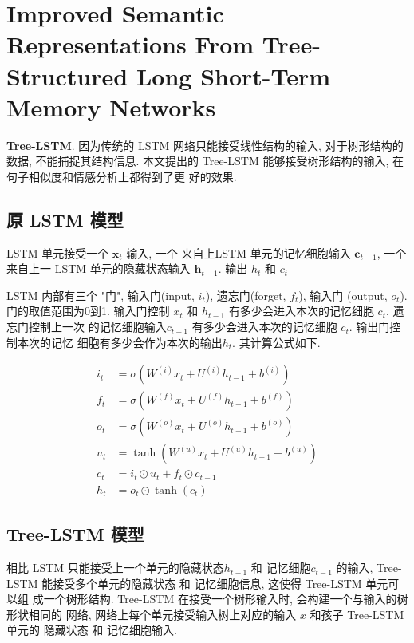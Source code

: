 \section{Improved Semantic Representations From Tree-Structured Long Short-Term Memory Networks}

\textbf{Tree-LSTM}\cite{tai2015improved}. 因为传统的 LSTM 网络只能接受线性结构的输入, 对于树形结构的数据, 不能捕捉其结构信息.
本文提出的 Tree-LSTM 能够接受树形结构的输入, 在句子相似度和情感分析上都得到了更
好的效果.

\subsection{原 LSTM 模型}

LSTM 单元接受一个 $\mathbf{x}_t$ 输入, 一个 来自上LSTM 单元的记忆细胞输入
$\mathbf{c}_{t-1}$,  一个来自上一 LSTM  单元的隐藏状态输入 $\mathbf{h}_{t-1}$.
输出   $h_t$ 和 $c_t$

LSTM 内部有三个 "门", 输入门(input, $i_t$), 遗忘门(forget, $f_t$), 输入门
(output, $o_t$). 门的取值范围为0到1.
输入门控制 $x_t$ 和 $h_{t-1}$ 有多少会进入本次的记忆细胞 $c_t$. 遗忘门控制上一次
的记忆细胞输入$c_{t-1}$ 有多少会进入本次的记忆细胞 $c_t$.  输出门控制本次的记忆
细胞有多少会作为本次的输出$h_t$. 其计算公式如下.

\begin{equation}
\begin{aligned}
 i_{t} &=\sigma\left(W^{(i)} x_{t}+U^{(i)} h_{t-1}+b^{(i)}\right) \\
 f_{t} &=\sigma\left(W^{(f)} x_{t}+U^{(f)} h_{t-1}+b^{(f)}\right) \\
 o_{t} &=\sigma\left(W^{(o)} x_{t}+U^{(o)} h_{t-1}+b^{(o)}\right) \\
 u_{t} &=\tanh \left(W^{(u)} x_{t}+U^{(u)} h_{t-1}+b^{(u)}\right) \\
 c_{t} &=i_{t} \odot u_{t}+f_{t} \odot c_{t-1} \\
 h_{t} &=o_{t} \odot \tanh \left(c_{t}\right) \end{aligned}
\end{equation}

\subsection{Tree-LSTM 模型}

相比 LSTM 只能接受上一个单元的隐藏状态$h_{t-1}$ 和 记忆细胞$c_{t-1}$ 的输入,
Tree-LSTM 能接受多个单元的隐藏状态 和 记忆细胞信息, 这使得 Tree-LSTM 单元可以组
成一个树形结构. Tree-LSTM 在接受一个树形输入时, 会构建一个与输入的树形状相同的
网络, 网络上每个单元接受输入树上对应的输入 $x$ 和孩子 Tree-LSTM单元的 隐藏状态
和 记忆细胞输入.

